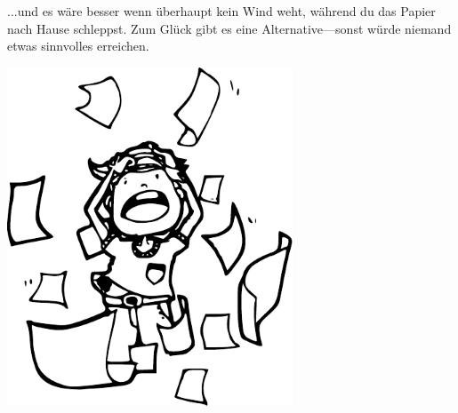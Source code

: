 $\ldots$und es wäre besser wenn überhaupt kein Wind weht, während du das Papier nach Hause schleppst. Zum Glück gibt es eine Alternative---sonst würde niemand etwas sinnvolles erreichen.


\begin{center}
\includegraphics*[width=85mm]{images/pullinghair}
\end{center}

